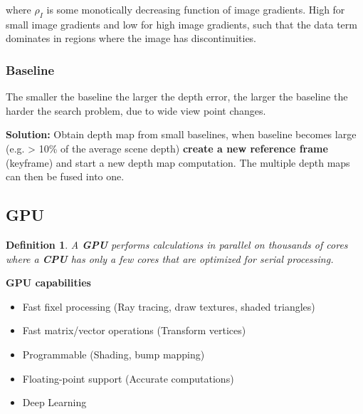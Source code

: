 \documentclass[10pt,a4paper]{scrartcl}
\newtheorem{define}{Definition}
\begin{document}
\begin{multicols*}{2}

where $\rho_I$ is some monotically decreasing function of image gradients. High for small image gradients and low for high image gradients, such that the data term dominates in regions where the image has discontinuities.

\subsubsection{Baseline}

The smaller the baseline the larger the depth error, the larger the baseline the harder the search problem, due to wide view point changes.

\textbf{Solution:} Obtain depth map from small baselines, when baseline becomes large (e.g. > 10\% of the average scene depth) \textbf{create a new reference frame} (keyframe) and start a new depth map computation. The multiple depth maps can then be fused into one.

\subsection{GPU}

\begin{define}
A \textbf{GPU} performs calculations in parallel on thousands of cores where a \textbf{CPU} has only a few cores that are optimized for serial processing.
\end{define}

\textbf{GPU capabilities}
\begin{itemize}
\item Fast fixel processing (Ray tracing, draw textures, shaded triangles)
\item Fast matrix/vector operations (Transform vertices)
\item Programmable (Shading, bump mapping)
\item Floating-point support (Accurate computations)
\item Deep Learning
\end{itemize}


\end{multicols*}
\end{document}
